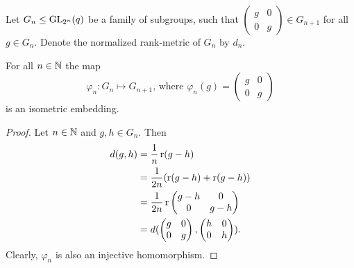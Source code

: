 Let $G_n\leq \operatorname{GL}_{2^n}(q)$ be a family of subgroups, such that 
$\begin{pmatrix}
g &0\\
0&g
\end{pmatrix}\in G_{n+1}$ for all $g\in G_n$. Denote the normalized rank-metric of $G_n$ by $d_n$.
\begin{lemma}
For all $n\in \mathbb{N}$ the map
\[\varphi_n\colon G_n\mapsto G_{n+1}\text{, where }\varphi_n(g)=\begin{pmatrix}
g &0\\
0&g
\end{pmatrix}\]
is an isometric embedding. 
\end{lemma}
\begin{proof}
Let $n\in\mathbb{N}$ and $g,h\in G_n$. Then
\begin{align*}
d(g,h)&=\frac{1}{n}\operatorname{r}(g-h)\\
&=\frac{1}{2n}(\operatorname{r}(g-h)+\operatorname{r}(g-h))\\
&=\frac{1}{2n}\operatorname{r}
\begin{pmatrix}
g-h &0\\
0&g-h
\end{pmatrix}\\
&=d(
\begin{pmatrix}
g &0\\
0&g
\end{pmatrix},
\begin{pmatrix}
h &0\\
0&h
\end{pmatrix}).
\end{align*}
Clearly, $\varphi_n$ is also an injective homomorphism.
\end{proof}

